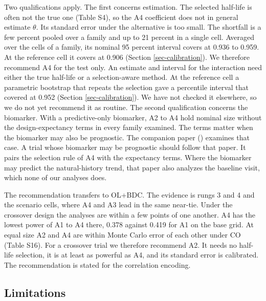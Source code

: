 \documentclass[
  11pt,
]{article}
\newcounter{none} %
\begin{document}
Two qualifications apply. The first concerns estimation. The selected
half-life is often not the true one (Table S4), so the A4 coefficient
does not in general estimate \(\theta\). Its standard error under the
alternative is too small. The shortfall is a few percent pooled over a
family and up to 21 percent in
a single cell.
Averaged over the cells of a family, its nominal 95 percent interval
covers at
0.936
to
0.959.
At the reference cell it covers at
0.906 (Section
\ref{sec-calibration}). We therefore recommend A4 for
the test only. An estimate and interval for the interaction need
either the true half-life or a selection-aware method. At the
reference cell a parametric bootstrap that repeats the selection gave
a percentile interval that covered at 0.952
(Section \ref{sec-calibration}). We have not checked it elsewhere,
so we do not yet recommend it as routine. The second qualification
concerns the biomarker. With a predictive-only biomarker, A2 to A4
hold nominal size without the design-expectancy terms in every family
examined. The terms matter when the biomarker may also be prognostic.
The companion paper () examines that case.
A trial whose biomarker may be prognostic should follow that paper. It
pairs the selection rule of A4 with the expectancy terms. Where
the biomarker may predict the natural-history trend, that paper also
analyzes the baseline visit, which none of our analyses does.

The recommendation transfers to OL+BDC. The evidence is rungs 3 and 4
and the scenario cells, where A4 and A3 lead in the same near-tie.
Under the crossover design the analyses are within a few points of
one another. A4 has the lowest power of A1 to A4 there,
0.378 against 0.419 for
A1 on the base grid. At equal size A2 and A4 are within Monte Carlo
error of each other under CO (Table S16).
For a crossover trial we therefore recommend A2. It needs no
half-life selection, it is at least as powerful as A4, and its
standard error is calibrated. The recommendation is stated for the correlation
encoding.

\subsection{Limitations}\label{limitations}
\end{document}
